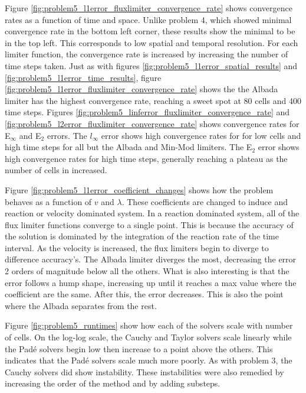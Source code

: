 Figure \ref{fig:problem5_l1error_fluxlimiter_convergence_rate} shows convergence rates as a function of time and space. Unlike problem 4, which showed minimal convergence rate in the bottom left corner, these results show the minimal to be in the top left. This corresponds to low spatial and temporal resolution. For each limiter function, the convergence rate is increased by increasing the number of time steps taken. Just as with figures \ref{fig:problem5_l1error_spatial_results} and \ref{fig:problem5_l1error_time_results}, figure \ref{fig:problem5_l1error_fluxlimiter_convergence_rate} shows the the Albada limiter has the highest convergence rate, reaching a sweet spot at 80 cells and 400 time steps. Figures \ref{fig:problem5_linferror_fluxlimiter_convergence_rate} and \ref{fig:problem5_l2error_fluxlimiter_convergence_rate} shows convergence rates for E${}_{\infty}$ and E${}_{2}$ errors. The $l_{\infty}$ error shows high convergence rates for for low cells and high time steps for all but the Albada and Min-Mod limiters. The E${}_{2}$ error shows high convergence rates for high time steps, generally reaching a plateau as the number of cells in increased.

Figure \ref{fig:problem5_l1error_coefficient_changes} shows how the problem behaves as a function of $v$ and $\lambda$. These coefficients are changed to induce and reaction or velocity dominated system. In a reaction dominated system, all of the flux limiter functions converge to a single point. This is because the accuracy of the solution is dominated by the integration of the reaction rate of the time interval. As the velocity is increased, the flux limiters begin to diverge to difference accuracy's. The Albada limiter diverges the most, decreasing the error 2 orders of magnitude below all the others. What is also interesting is that the error follows a hump shape, increasing up until it reaches a max value where the coefficient are the same. After this, the error decreases. This is also the point where the Albada separates from the rest. 

Figure \ref{fig:problem5_runtimes} show how each of the solvers scale with number of cells. On the log-log scale, the Cauchy and Taylor solvers scale linearly while the Pad\'e solvers begin low then increase to a point above the others. This indicates that the Pad\'e solvers scale much more poorly. As with problem 3, the Cauchy solvers did show instability. These instabilities were also remedied by increasing the order of the method and by adding substeps. 

